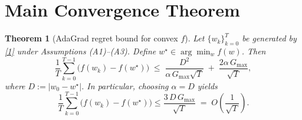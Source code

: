 \documentclass{article}
\newtheorem{theorem}{Theorem}
\begin{document}
\section*{Main Convergence Theorem}
\begin{theorem}[AdaGrad regret bound for convex $f$]\label{thm:regret}
Let $\{w_k\}_{k=0}^{T}$ be generated by \eqref{1} under Assumptions (A1)–(A3).  
Define $w^{\star}\in\arg\min_{w}f(w)$. Then
\[
\frac{1}{T}\sum_{k=0}^{T-1}\bigl(f(w_k)-f(w^{\star})\bigr)
\;\le\;
\frac{D^{2}}{\alpha\,G_{\max}\sqrt{T}}
\;+\;
\frac{2\alpha\,G_{\max}}{\sqrt{T}},
\tag{2}
\]
where $D:=|w_0-w^{\star}|$.
In particular, choosing $\alpha=D$ yields
\[
\frac{1}{T}\sum_{k=0}^{T-1}\bigl(f(w_k)-f(w^{\star})\bigr)
\le
\frac{3\,D\,G_{\max}}{\sqrt{T}}
\;=\;O\!\left(\frac{1}{\sqrt{T}}\right).
\]
\end{theorem}
\end{document}
